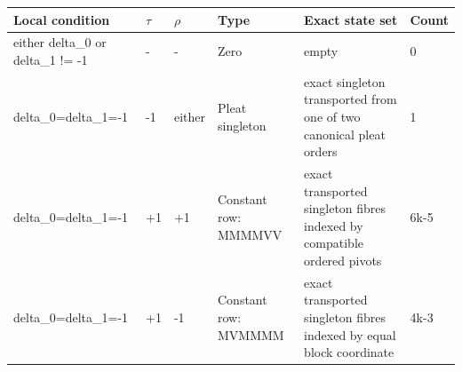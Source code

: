 \begin{tabular}{llllll}
\toprule
Local condition & $\tau$ & $\rho$ & Type & Exact state set & Count \\
\midrule
either delta\_0 or delta\_1 != -1 & - & - & Zero & empty & 0 \\
delta\_0=delta\_1=-1 & -1 & either & Pleat singleton & exact singleton transported from one of two canonical pleat orders & 1 \\
delta\_0=delta\_1=-1 & +1 & +1 & Constant row: MMMMVV & exact transported singleton fibres indexed by compatible ordered pivots & 6k-5 \\
delta\_0=delta\_1=-1 & +1 & -1 & Constant row: MVMMMM & exact transported singleton fibres indexed by equal block coordinate & 4k-3 \\
\bottomrule
\end{tabular}
